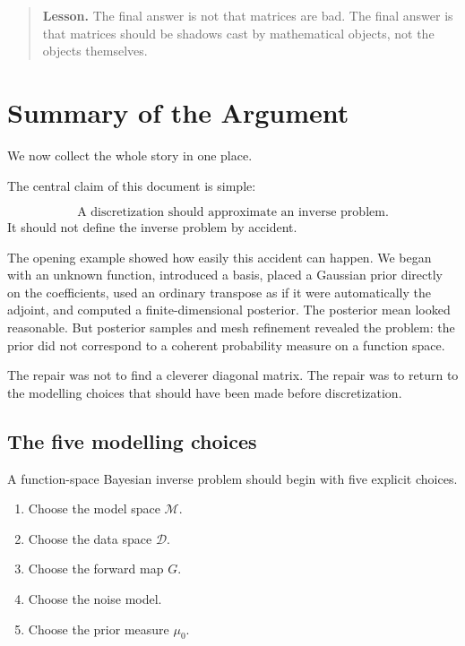 \documentclass[11pt,a4paper]{book}
\newenvironment{lesson}
  {\begin{quote}\textbf{Lesson.}}
  {\end{quote}}
\newcommand{\M}{\mathcal{M}}      %
\newcommand{\D}{\mathcal{D}}      %
\newcommand{\prior}{\mu_0}
\newcommand{\G}{G}
\begin{document}
\begin{lesson}
The final answer is not that matrices are bad.
The final answer is that matrices should be shadows cast by mathematical
objects, not the objects themselves.
\end{lesson}

\backmatter

\chapter{Summary of the Argument}

We now collect the whole story in one place.

The central claim of this document is simple:

\[
    \text{A discretization should approximate an inverse problem.}
\]
It should not define the inverse problem by accident.

The opening example showed how easily this accident can happen. We began with
an unknown function, introduced a basis, placed a Gaussian prior directly on the
coefficients, used an ordinary transpose as if it were automatically the
adjoint, and computed a finite-dimensional posterior. The posterior mean looked
reasonable. But posterior samples and mesh refinement revealed the problem:
the prior did not correspond to a coherent probability measure on a function
space.

The repair was not to find a cleverer diagonal matrix. The repair was to return
to the modelling choices that should have been made before discretization.

\section{The five modelling choices}

A function-space Bayesian inverse problem should begin with five explicit
choices.

\begin{enumerate}[label=\arabic*.]
    \item Choose the model space $\M$.
    \item Choose the data space $\D$.
    \item Choose the forward map $\G$.
    \item Choose the noise model.
    \item Choose the prior measure $\prior$.
\end{enumerate}
\end{document}

